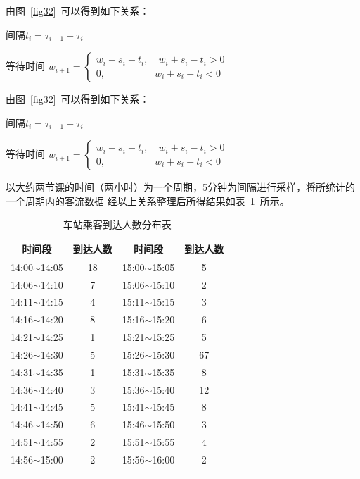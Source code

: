 由图~\ref{fig32}~可以得到如下关系：
    
间隔\quad \quad \quad \quad$t_i = \tau_{i+1} - \tau_i$
    
等待时间 \quad \quad 
$
w_{i+1} = 
\begin{cases}
    w_i + s_i - t_i,\quad w_i + s_i - t_i > 0
    \\
    0, \qquad \qquad \quad w_i + s_i - t_i < 0
\end{cases}
$
    
    
    
由图~\ref{fig32}~可以得到如下关系：
    
间隔\quad \quad \quad \quad$t_i = \tau_{i+1} - \tau_i$
    
等待时间 \quad \quad 
$
w_{i+1} = 
\begin{cases}
    w_i + s_i - t_i,\quad w_i + s_i - t_i > 0
    \\
    0, \qquad \qquad \quad w_i + s_i - t_i < 0
\end{cases}
$
    

以大约两节课的时间（两小时）为一个周期，5分钟为间隔进行采样，将所统计的一个周期内的客流数据
经以上关系整理后所得结果如表~\ref{table_1}~所示。
\begin{table}[htbp!]
    \centering
    \caption{车站乘客到达人数分布表}\label{table_1}
    
    \begin{tabular}{cccc}
    \whline 
    时间段 & 到达人数 & 时间段 & 到达人数 \\ 
    \hline 
    14:00$ \sim $14:05 & 18 &15:00$ \sim $15:05&5\\ 
    14:06$ \sim $14:10 & 7 &15:06$ \sim $15:10&2\\ 
    14:11$ \sim $14:15 & 4 &15:11$ \sim $15:15&3\\ 
    14:16$ \sim $14:20 & 8 &15:16$ \sim $15:20&6\\ 
    14:21$ \sim $14:25 & 1 &15:21$ \sim $15:25&5\\ 
    14:26$ \sim $14:30 & 5 &15:26$ \sim $15:30&67\\ 
    14:31$ \sim $14:35 & 1 &15:31$ \sim $15:35&8\\ 
    14:36$ \sim $14:40 & 3 &15:36$ \sim $15:40&12\\ 
    14:41$ \sim $14:45 & 5 &15:41$ \sim $15:45&8\\ 
    14:46$ \sim $14:50 & 6 &15:46$ \sim $15:50&3\\ 
    14:51$ \sim $14:55 & 2 &15:51$ \sim $15:55&4\\ 
    14:56$ \sim $15:00 & 2 &15:56$ \sim $16:00&2\\ 
    \whline 
    \end{tabular}
    \end{table}


